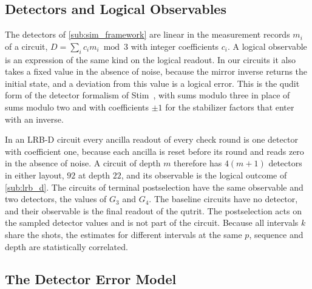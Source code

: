 \subsection{Detectors and Logical Observables}
\label{app:sdim-detectors}

The detectors of \autoref{sub:sim_framework} are linear in the measurement records $m_i$ of a circuit, $D = \sum_i c_i m_i \bmod 3$ with integer coefficients $c_i$. A logical observable is an expression of the same kind on the logical readout. In our circuits it also takes a fixed value in the absence of noise, because the mirror inverse returns the initial state, and a deviation from this value is a logical error. This is the qudit form of the detector formalism of Stim~\cite{Gidney2021Stim}, with sums modulo three in place of sums modulo two and with coefficients $\pm 1$ for the stabilizer factors that enter with an inverse.

In an LRB-D circuit every ancilla readout of every check round is one detector with coefficient one, because each ancilla is reset before its round and reads zero in the absence of noise. A circuit of depth $m$ therefore has $4(m+1)$ detectors in either layout, $92$ at depth $22$, and its observable is the logical outcome of \autoref{sub:lrb_d}. The circuits of terminal postselection have the same observable and two detectors, the values of $G_3$ and $G_4$. The baseline circuits have no detector, and their observable is the final readout of the qutrit. The postselection acts on the sampled detector values and is not part of the circuit. Because all intervals $k$ share the shots, the estimates for different intervals at the same $p$, sequence and depth are statistically correlated.

\subsection{The Detector Error Model}
\label{app:sdim-model}

